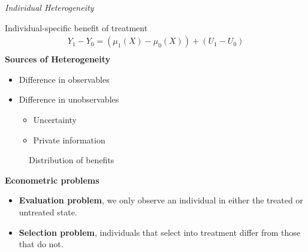 \begin{frame}\begin{center}
		\LARGE\textit{Individual Heterogeneity}
\end{center}\end{frame}
\begin{frame}
	Individual-specific benefit of treatment
	\begin{align*}
		Y_1 - Y_0 = (\mu_1(X) - \mu_0(X)) + (U_1 - U_0)\\
	\end{align*}
	\textbf{Sources of Heterogeneity}\vspace{0.5cm}
	\begin{itemize}\setlength\itemsep{1em}
		\item Difference in observables
		\item Difference in unobservables\medskip
		\begin{itemize}\setlength\itemsep{1em}
			\item Uncertainty
			\item Private information
		\end{itemize}
	\end{itemize}
\end{frame}
\begin{frame}
\begin{figure}[htp]\centering\caption{Distribution of benefits}
\end{figure}
\end{frame}
\begin{frame}\textbf{Econometric problems}\\\vspace{0.5cm}

\begin{itemize}\setlength\itemsep{1em}
\item \textbf{Evaluation problem}, we only observe an individual in either the treated or untreated state.
\item \textbf{Selection problem}, individuals that select into treatment differ from those that do not.
\end{itemize}

\end{frame}
